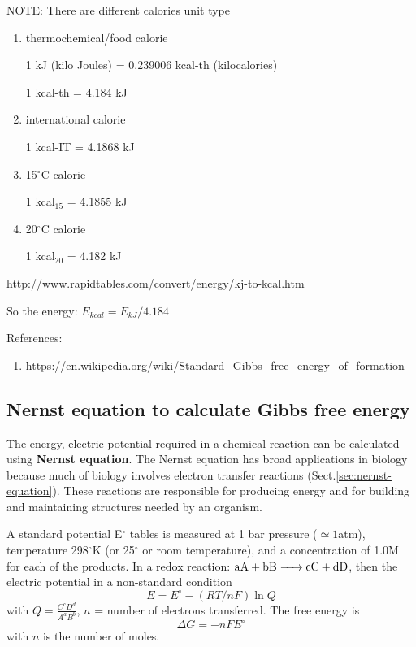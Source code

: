 \begin{mdframed}
NOTE: There are different calories unit type

\begin{enumerate}
  \item thermochemical/food calorie

1 kJ (kilo Joules) = 0.239006 kcal-th (kilocalories)

1 kcal-th = 4.184 kJ

  
  \item international calorie

1 kcal-IT = 4.1868 kJ
  
  \item 15$^\circ$C calorie

1 kcal$_{15}$ = 4.1855 kJ
  
  \item 20$^\circ$C calorie

1 kcal$_{20}$ = 4.182 kJ

\end{enumerate}
\url{http://www.rapidtables.com/convert/energy/kj-to-kcal.htm}

So the energy: $E_{kcal} = E_{kJ} / 4.184$
\end{mdframed}

References:
\begin{enumerate}
  \item
  \url{https://en.wikipedia.org/wiki/Standard_Gibbs_free_energy_of_formation}
\end{enumerate}

\subsection{Nernst equation to calculate Gibbs free energy}

The energy, electric potential required in a chemical reaction can be calculated
using {\bf Nernst equation}. 
The Nernst equation has broad applications in biology because much of biology
involves electron transfer reactions (Sect.\ref{sec:nernst-equation}).
These reactions are responsible for producing energy and for building and
maintaining structures needed by an organism.

A standard potential E$^\circ$ tables is measured at 1 bar pressure ($\simeq
1$atm), temperature 298$^\circ$K (or 25$^\circ$ or room temperature), and a
concentration of 1.0M for each of the products. In a redox reaction: 
$\ce{aA + bB -> cC + dD}$, then the electric potential in a non-standard condition
\begin{equation}
E = E^\circ - (RT/nF)\ln Q
\end{equation}
with $Q = \frac{C^cD^d}{A^aB^b}$, $n$ = number of electrons transferred. The
free energy is
\begin{equation}
\Delta G = -nFE^\circ
\end{equation}
with $n$ is the number of moles.


